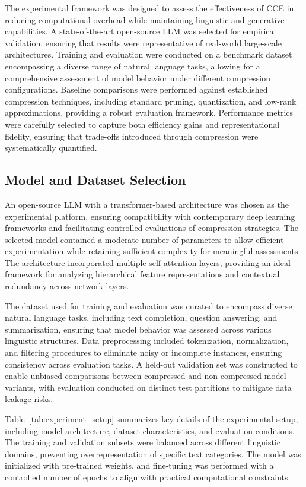 \documentclass{article}
\begin{document}
The experimental framework was designed to assess the effectiveness of CCE in reducing computational overhead while maintaining linguistic and generative capabilities. A state-of-the-art open-source LLM was selected for empirical validation, ensuring that results were representative of real-world large-scale architectures. Training and evaluation were conducted on a benchmark dataset encompassing a diverse range of natural language tasks, allowing for a comprehensive assessment of model behavior under different compression configurations. Baseline comparisons were performed against established compression techniques, including standard pruning, quantization, and low-rank approximations, providing a robust evaluation framework. Performance metrics were carefully selected to capture both efficiency gains and representational fidelity, ensuring that trade-offs introduced through compression were systematically quantified. 

\subsection{Model and Dataset Selection}

An open-source LLM with a transformer-based architecture was chosen as the experimental platform, ensuring compatibility with contemporary deep learning frameworks and facilitating controlled evaluations of compression strategies. The selected model contained a moderate number of parameters to allow efficient experimentation while retaining sufficient complexity for meaningful assessments. The architecture incorporated multiple self-attention layers, providing an ideal framework for analyzing hierarchical feature representations and contextual redundancy across network layers. 

The dataset used for training and evaluation was curated to encompass diverse natural language tasks, including text completion, question answering, and summarization, ensuring that model behavior was assessed across various linguistic structures. Data preprocessing included tokenization, normalization, and filtering procedures to eliminate noisy or incomplete instances, ensuring consistency across evaluation tasks. A held-out validation set was constructed to enable unbiased comparisons between compressed and non-compressed model variants, with evaluation conducted on distinct test partitions to mitigate data leakage risks.

Table~\ref{tab:experiment_setup} summarizes key details of the experimental setup, including model architecture, dataset characteristics, and evaluation conditions. The training and validation subsets were balanced across different linguistic domains, preventing overrepresentation of specific text categories. The model was initialized with pre-trained weights, and fine-tuning was performed with a controlled number of epochs to align with practical computational constraints. 
\end{document}

